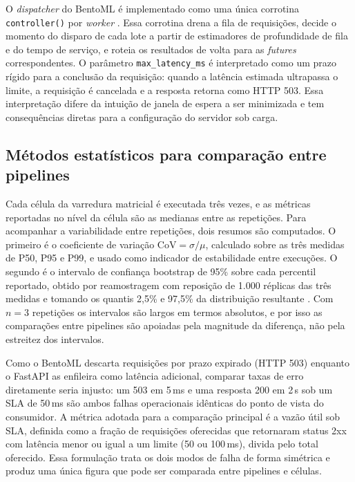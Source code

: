 O \textit{dispatcher} do BentoML é implementado como uma única corrotina
\texttt{controller()} por \textit{worker} \cite{bentoml_dispatcher}. Essa
corrotina drena a fila de requisições, decide o momento do disparo de cada
lote a partir de estimadores de profundidade de fila e do tempo de
serviço, e roteia os resultados de volta para as \textit{futures}
correspondentes. O parâmetro \texttt{max\_latency\_ms} é interpretado como um
prazo rígido para a conclusão da requisição: quando a latência estimada
ultrapassa o limite, a requisição é cancelada e a resposta retorna como HTTP
503. Essa interpretação difere da intuição de janela de espera a ser
minimizada e tem consequências diretas para a configuração do servidor sob
carga.

\subsection{Métodos estatísticos para comparação entre pipelines}

Cada célula da varredura matricial é executada três vezes, e as métricas
reportadas no nível da célula são as medianas entre as repetições. Para
acompanhar a variabilidade entre repetições, dois resumos são computados.
O primeiro é o coeficiente de variação $\text{CoV} = \sigma/\mu$, calculado
sobre as três medidas de P50, P95 e P99, e usado como indicador de
estabilidade entre execuções. O segundo é o intervalo de confiança bootstrap
de 95\% sobre cada percentil reportado, obtido por reamostragem com
reposição de 1.000 réplicas das três medidas e tomando os quantis 2,5\% e
97,5\% da distribuição resultante \cite{efron1979}. Com $n = 3$ repetições os
intervalos são largos em termos absolutos, e por isso as comparações
entre pipelines são apoiadas pela magnitude da diferença, não pela estreitez
dos intervalos.

Como o BentoML descarta requisições por prazo expirado (HTTP 503) enquanto
o FastAPI as enfileira como latência adicional, comparar taxas de erro
diretamente seria injusto: um 503 em 5\,ms e uma resposta 200 em 2\,s sob
um SLA de 50\,ms são ambos falhas operacionais idênticas do ponto de vista
do consumidor. A métrica adotada para a comparação principal é a vazão útil
sob SLA, definida como a fração de requisições oferecidas que retornaram
status 2xx com latência menor ou igual a um limite (50 ou 100\,ms), divida
pelo total oferecido. Essa formulação trata os dois modos de falha de forma
simétrica e produz uma única figura que pode ser comparada entre pipelines
e células.

